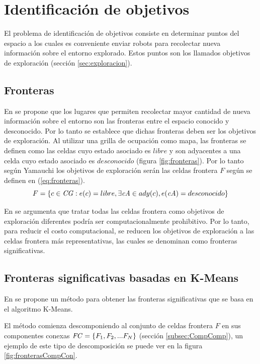 \section{Identificación de objetivos}\label{sec:pc:idobj}
El problema de identificación de objetivos consiste en determinar puntos
del espacio a los cuales es conveniente enviar robots para recolectar nueva
información sobre el entorno explorado. Estos puntos son los llamados objetivos
de exploración (sección \ref{sec:exploracion}). 

\subsection{Fronteras}\label{subsec:todasFront}
En \cite{yamauchi1997frontier} se propone que los lugares que permiten
recolectar mayor cantidad de nueva información sobre el entorno son las
fronteras entre el espacio conocido y desconocido. Por lo tanto se establece que dichas
fronteras deben ser los objetivos de exploración.
Al utilizar una grilla de ocupación como mapa, las fronteras se definen como las
celdas cuyo estado asociado es $libre$ y son adyacentes a una celda cuyo estado
asociado es $desconocido$ (figura \ref{fig:fronteras}).
Por lo tanto según Yamauchi los objetivos de exploración serán las celdas
frontera $F$ según se definen en (\ref{eq:fronteras}).
\begin{equation} 
  F = \{ c \in \mathit{CG} : e(c) = libre, \exists \mathit{cA} \in ady(c), e(\mathit{cA}) = desconocido  \}
  \label{eq:fronteras}
\end{equation}

En \cite{Amorin2019} se argumenta que tratar todas las celdas frontera como
objetivos de exploración diferentes podría ser computacionalmente prohibitivo.
Por lo tanto, para reducir el costo computacional, se reducen los objetivos de
exploración a las celdas frontera más representativas, las cuales se
denominan como fronteras significativas.

\subsection{Fronteras significativas basadas en K-Means}\label{subsec:simpKM}

En \cite{Amorin2019} se propone un método para obtener las fronteras
significativas que se basa en el algoritmo K-Means.

El método comienza descomponiendo al conjunto de celdas frontera $F$
en sus componentes conexas $\mathit{FC}=\{F_1,F_2,...F_N\}$
(sección \ref{subsec:CompComp}), un ejemplo de este tipo de descomposición se
puede ver en la figura \ref{fig:fronterasCompCon}.

